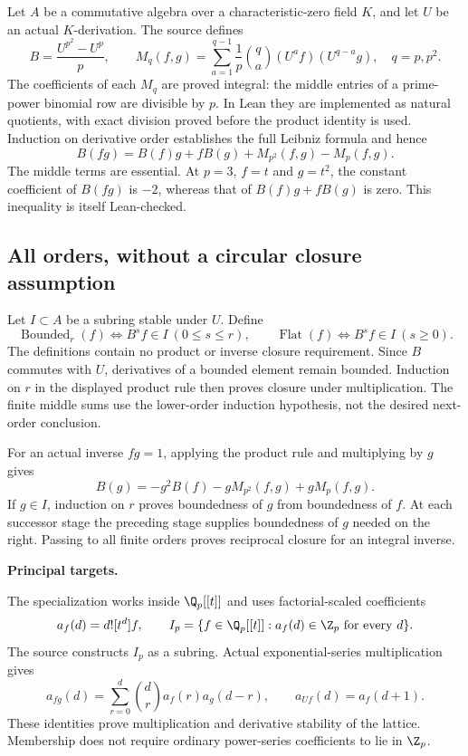 \par\medskip
{}
Let $A$ be a commutative algebra over a characteristic-zero field $K$, and let $U$ be an actual $K$-derivation. The source defines
\[
 B=\frac{U^{p^2}-U^p}{p},\qquad
 M_q(f,g)=\sum_{a=1}^{q-1}\frac{1}{p}\binom qa
          (U^a f)(U^{q-a}g),\quad q=p,p^2.
\]
The coefficients of each $M_q$ are proved integral: the middle entries of a prime-power binomial row are divisible by $p$. In Lean they are implemented as natural quotients, with exact division proved before the product identity is used. Induction on derivative order establishes the full Leibniz formula and hence
\[
\boxed{B(fg)=B(f)g+fB(g)+M_{p^2}(f,g)-M_p(f,g).}
\]
The middle terms are essential. At $p=3$, $f=t$ and $g=t^2$, the constant coefficient of $B(fg)$ is $-2$, whereas that of $B(f)g+fB(g)$ is zero. This inequality is itself Lean-checked.

\subsection*{All orders, without a circular closure assumption}
Let $I\subset A$ be a subring stable under $U$. Define
\[
 \operatorname{Bounded}_r(f)\iff B^s f\in I\ (0\le s\le r),
 \qquad \operatorname{Flat}(f)\iff B^s f\in I\ (s\ge0).
\]
The definitions contain no product or inverse closure requirement. Since $B$ commutes with $U$, derivatives of a bounded element remain bounded. Induction on $r$ in the displayed product rule then proves closure under multiplication. The finite middle sums use the lower-order induction hypothesis, not the desired next-order conclusion.

For an actual inverse $fg=1$, applying the product rule and multiplying by $g$ gives
\[
 B(g)=-g^2B(f)-gM_{p^2}(f,g)+gM_p(f,g).
\]
If $g\in I$, induction on $r$ proves boundedness of $g$ from boundedness of $f$. At each successor stage the preceding stage supplies boundedness of $g$ needed on the right. Passing to all finite orders proves reciprocal closure for an integral inverse.

\textbf{Principal targets.}\par
{}\par
{}\par
{}

\par\medskip
{}
The specialization works inside $\Q_p[[t]]$ and uses factorial-scaled coefficients
\[
 a_f(d)=d![t^d]f,\qquad
 I_p=\{f\in\Q_p[[t]]:a_f(d)\in\Z_p\text{ for every }d\}.
\]
The source constructs $I_p$ as a subring. Actual exponential-series multiplication gives
\[
 a_{fg}(d)=\sum_{r=0}^{d}\binom dr a_f(r)a_g(d-r),
 \qquad a_{Uf}(d)=a_f(d+1).
\]
These identities prove multiplication and derivative stability of the lattice. Membership does not require ordinary power-series coefficients to lie in $\Z_p$.

